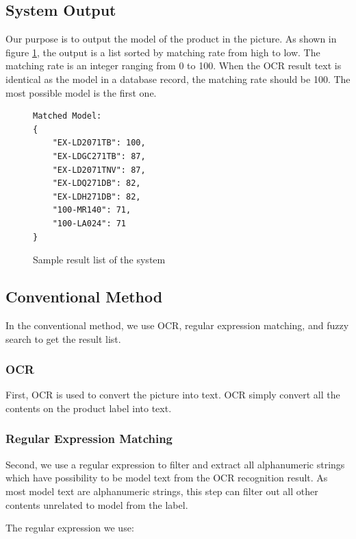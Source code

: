 \documentclass[technicalreport]{ieicej}
\begin{document}
    
    \subsection{System Output}
        Our purpose is to output the model of the product in the picture. As shown in figure \ref{fig:result-sample}, the output is a list sorted by matching rate from high to low. The matching rate is an integer ranging from 0 to 100. When the OCR result text is identical as the model in a database record, the matching rate should be 100. The most possible model is the first one.

        \begin{figure}[t] 
            \begin{center}
        \begin{BVerbatim}
Matched Model:
{
    "EX-LD2071TB": 100,
    "EX-LDGC271TB": 87,
    "EX-LD2071TNV": 87,
    "EX-LDQ271DB": 82,
    "EX-LDH271DB": 82,
    "100-MR140": 71,
    "100-LA024": 71
}
        \end{BVerbatim}
        \end{center}
            \caption{Sample result list of the system}
            \label{fig:result-sample}
        \end{figure}


    \subsection{Conventional Method}
        In the conventional method, we use OCR, regular expression matching, and fuzzy search to get the result list.

        \subsubsection{OCR}
            First, OCR is used to convert the picture into text. OCR simply convert all the contents on the product label into text.
        

        \subsubsection{Regular Expression Matching}
            Second, we use a regular expression to filter and extract all alphanumeric strings which have possibility to be model text from the OCR recognition result. As most model text are alphanumeric strings, this step can filter out all other contents unrelated to model from the label.

            The regular expression we use:
\end{document}
